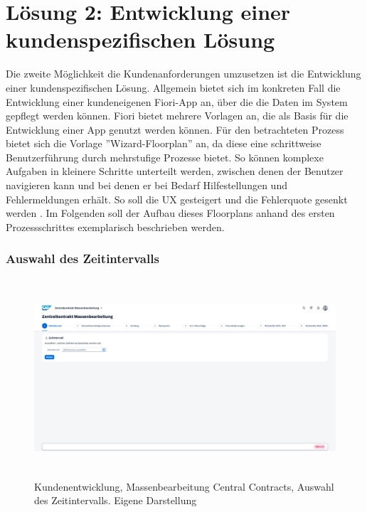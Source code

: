 \section{Lösung 2: Entwicklung einer kundenspezifischen Lösung}

Die zweite Möglichkeit die Kundenanforderungen umzusetzen ist die Entwicklung einer kundenspezifischen Lösung. Allgemein bietet sich im konkreten Fall die Entwicklung einer kundeneigenen Fiori-App an, über die die Daten im System gepflegt werden können. Fiori bietet mehrere Vorlagen an, die als Basis für die Entwicklung einer App genutzt werden können. Für den betrachteten Prozess bietet sich die Vorlage ''Wizard-Floorplan'' an, da diese eine schrittweise Benutzerführung durch mehrstufige Prozesse bietet. So können komplexe Aufgaben in kleinere Schritte unterteilt werden, zwischen denen der Benutzer navigieren kann und bei denen er bei Bedarf Hilfestellungen und Fehlermeldungen erhält. So soll die UX gesteigert und die Fehlerquote gesenkt werden \parencite[Vgl.][]{praxis_sap_wizard_floorplan_2024}. Im Folgenden soll der Aufbau dieses Floorplans anhand des ersten Prozessschrittes exemplarisch beschrieben werden.

\subsubsection{Auswahl des Zeitintervalls}

\begin{figure}[H]
    \centering
    \includegraphics[height=7.37cm]{Bilder/Praxisteil-KL-Schritt-1.png}
    \caption[Kundenentwicklung, Massenbearbeitung Central Contracts, Auswahl des Zeitintervalls]{Kundenentwicklung, Massenbearbeitung Central Contracts, Auswahl des Zeitintervalls. Eigene Darstellung}
    \label{fig:PraxisKLSchritt1}
\end{figure}


